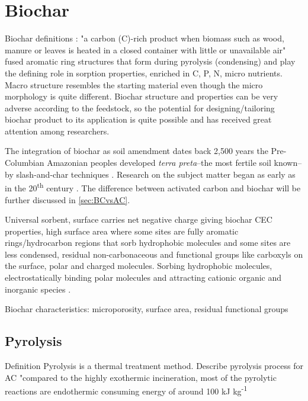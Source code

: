 \section{Biochar}
Biochar definitions \citep{LehmannAndJoseph2015}:
"a carbon (C)-rich product when biomass such as wood, manure or leaves is heated in a closed container with little or unavailable air" \citep{LehmannAndJoseph2015} fused aromatic ring structures that form during pyrolysis (condensing) and play the defining role in sorption properties, enriched in C, P, N, micro nutrients. Macro structure resembles the starting material even though the micro morphology is quite different. Biochar structure and properties can be very adverse according to the feedstock, so the potential for designing/tailoring biochar product to its application is quite possible and has received great attention among researchers. 

The integration of biochar as soil amendment dates back 2,500 years the Pre-Columbian Amazonian peoples developed \textit{terra preta}--the most fertile soil known--by slash-and-char techniques \citep{Tindall2017,Ahmad2014}. Research on the subject matter began as early as in the 20\textsuperscript{th} century \citep{Retan1915}. The difference between activated carbon and biochar will be further discussed in \cref{sec:BCvsAC}. 

Universal sorbent, surface carries net negative charge giving biochar CEC properties, high surface area where some sites are fully aromatic rings/hydrocarbon regions that sorb hydrophobic molecules and some sites are less condensed, residual non-carbonaceous and functional groups like carboxyls on the surface, polar and charged molecules. Sorbing hydrophobic molecules, electrostatically binding polar molecules and attracting cationic organic and inorganic species \citep{Ahmad2014,vanloon2017Ch14}. 

Biochar characteristics: microporosity, surface area, residual functional groups

\subsection{Pyrolysis}
Definition 
Pyrolysis is a thermal treatment method. 
Describe pyrolysis process for AC
"compared to the highly exothermic incineration, most of the pyrolytic reactions are endothermic consuming energy of around 100 kJ kg\textsuperscript{-1}

